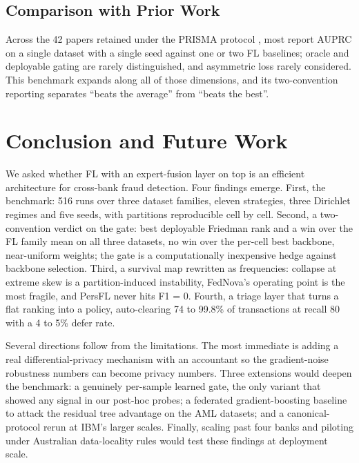 \documentclass[a4paper, 10pt, conference]{ieeeconf}
\begin{document}
\subsection{Comparison with Prior Work}
Across the 42 papers retained under the PRISMA protocol \cite{r8}, most report
AUPRC on a single dataset with a single seed against one or two FL baselines;
oracle and deployable gating are rarely distinguished, and asymmetric loss
rarely considered. This benchmark expands along all of those dimensions, and its
two-convention reporting separates ``beats the average'' from ``beats the
best''.

\section{Conclusion and Future Work}

We asked whether FL with an expert-fusion layer on top is an efficient
architecture for cross-bank fraud detection. Four findings emerge. First, the
benchmark: 516 runs over three dataset families, eleven strategies, three
Dirichlet regimes and five seeds, with partitions reproducible cell by cell.
Second, a two-convention verdict on the gate: best deployable Friedman rank and
a win over the FL family mean on all three datasets, no win over the per-cell
best backbone, near-uniform weights; the gate is a computationally inexpensive
hedge against backbone selection. Third, a survival map rewritten as
frequencies: collapse at extreme skew is a partition-induced instability,
FedNova's operating point is the most fragile, and PersFL never hits F1 = 0.
Fourth, a triage layer that turns a flat ranking into a policy, auto-clearing 74
to 99.8\% of transactions at recall 80 with a 4 to 5\% defer rate.

Several directions follow from the limitations. The most immediate is adding a
real differential-privacy mechanism with an accountant so the gradient-noise
robustness numbers can become privacy numbers. Three extensions would deepen the
benchmark: a genuinely per-sample learned gate, the only variant that showed any
signal in our post-hoc probes; a federated gradient-boosting baseline to attack
the residual tree advantage on the AML datasets; and a canonical-protocol rerun
at IBM's larger scales. Finally, scaling past four banks and piloting under
Australian data-locality rules would test these findings at deployment scale.

\end{document}
